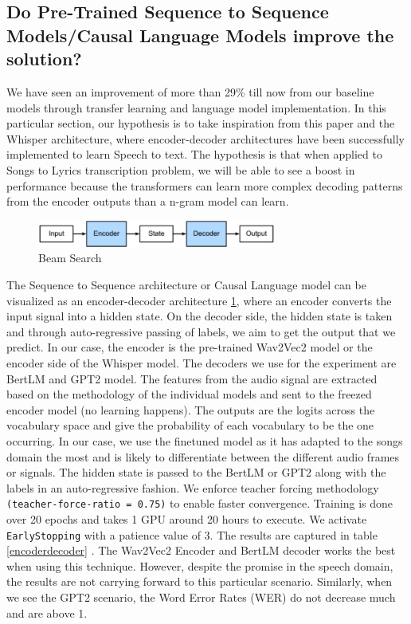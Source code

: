 \subsection{Do Pre-Trained Sequence to Sequence Models/Causal Language Models improve the solution?}

We have seen an improvement of more than 29\% till now from our baseline models through transfer learning and language model implementation. In this particular section, our hypothesis is to take inspiration from this paper \cite{wang2021large} and the Whisper architecture, where encoder-decoder architectures have been successfully implemented to learn Speech to text. The hypothesis is that when applied to Songs to Lyrics transcription problem, we will be able to see a boost in performance because the transformers can learn more complex decoding patterns from the encoder outputs than a n-gram model can learn.

\begin{figure} [H]
    \centering
    \includegraphics[width=0.7\textwidth]{05-research study/figures/encoder-decoder.pdf}
    \caption{Beam Search \cite{zhang2023dive}}
    \label{fig:encoderdecoder}
\end{figure}



The Sequence to Sequence architecture or Causal Language model can be visualized as an encoder-decoder architecture \ref{fig:encoderdecoder}, where an encoder converts the input signal into a hidden state. On the decoder side, the hidden state is taken and through auto-regressive passing of labels, we aim to get the output that we predict. In our case, the encoder is the pre-trained Wav2Vec2 model or the encoder side of the Whisper model. The decoders we use for the experiment are BertLM  and GPT2 model. The features from the audio signal are extracted based on the methodology of the individual models and sent to the freezed encoder model (no learning happens). The outputs are the logits across the vocabulary space and give the probability of each vocabulary to be the one occurring. In our case, we use the finetuned model as it has adapted to the songs domain the most and is likely to differentiate between the different audio frames or signals. The hidden state is passed to the BertLM or GPT2 along with the labels in an auto-regressive fashion. We enforce teacher forcing methodology \texttt{(teacher-force-ratio = 0.75)} to enable faster convergence. Training is done over 20 epochs and takes 1 GPU around 20 hours to execute. We activate \texttt{EarlyStopping} with a patience value of 3. The results are captured in table \ref{encoderdecoder} . The Wav2Vec2 Encoder and BertLM decoder works the best when using this technique. However, despite the promise in the speech domain, the results are not carrying forward to this particular scenario. Similarly, when we see the GPT2 scenario, the Word Error Rates (WER) do not decrease much and are above 1.

